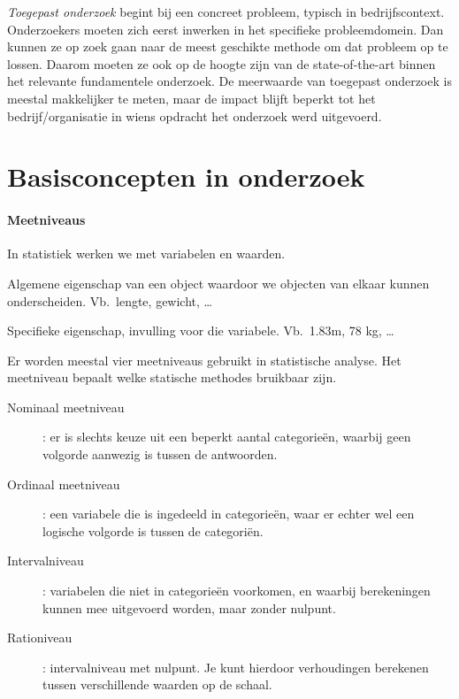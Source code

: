 \emph{Toegepast onderzoek} begint bij een concreet probleem, typisch in bedrijfscontext. Onderzoekers moeten zich eerst inwerken in het specifieke probleemdomein. Dan kunnen ze op zoek gaan naar de meest geschikte methode om dat probleem op te lossen. Daarom moeten ze ook op de hoogte zijn van de state-of-the-art binnen het relevante fundamentele onderzoek. De meerwaarde van toegepast onderzoek is meestal makkelijker te meten, maar de impact blijft beperkt tot het bedrijf/organisatie in wiens opdracht het onderzoek werd uitgevoerd.

\section{Basisconcepten in onderzoek}

\paragraph{Meetniveaus}

In statistiek werken we met variabelen en waarden.

\begin{definition}[Variabele] 
    Algemene eigenschap van een object waardoor we objecten van elkaar kunnen onderscheiden. Vb.~lengte, gewicht, \ldots
\end{definition}  
\begin{definition}[Waarde]
    Specifieke eigenschap, invulling voor die variabele. Vb.~1.83m, 78 kg, \ldots
\end{definition}

Er worden meestal vier meetniveaus gebruikt in statistische analyse. Het meetniveau bepaalt welke statische methodes bruikbaar zijn. 
\begin{description}
	\item [Nominaal meetniveau] : er is slechts keuze uit een beperkt aantal categorie\"en, waarbij geen volgorde aanwezig is tussen de antwoorden.
	\item [Ordinaal meetniveau] : een variabele die is ingedeeld in categorie\"en, waar er echter wel een logische volgorde is tussen de categori\"en. 
	\item [Intervalniveau] : variabelen die niet in categorie\"en voorkomen, en waarbij berekeningen kunnen mee uitgevoerd worden, maar zonder nulpunt.
	\item [Rationiveau] : intervalniveau met nulpunt. Je kunt hierdoor verhoudingen berekenen tussen verschillende waarden op de schaal.
\end{description}

